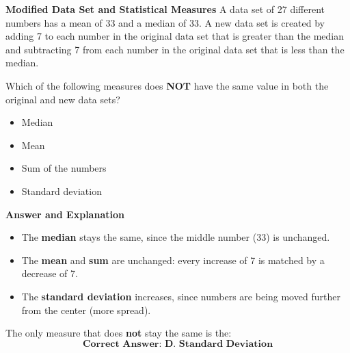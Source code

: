 \documentclass{beamer}
\begin{document}
\begin{frame}{\textbf{Modified Data Set and Statistical Measures}}
A data set of 27 different numbers has a mean of 33 and a median of 33. A new data set is created by adding 7 to each number in the original data set that is greater than the median and subtracting 7 from each number in the original data set that is less than the median.

Which of the following measures does \textbf{NOT} have the same value in both the original and new data sets?

\begin{itemize}
    \item[A.] Median
    \item[B.] Mean
    \item[C.] Sum of the numbers
    \item[D.] Standard deviation
\end{itemize}
\end{frame}

\begin{frame}{\textbf{Answer and Explanation}}
\begin{itemize}
    \item The \textbf{median} stays the same, since the middle number (33) is unchanged.
    \item The \textbf{mean} and \textbf{sum} are unchanged: every increase of 7 is matched by a decrease of 7.
    \item The \textbf{standard deviation} increases, since numbers are being moved further from the center (more spread).
\end{itemize}

The only measure that does \textbf{not} stay the same is the:
\[
\textbf{Correct Answer: D. Standard Deviation}
\]
\end{frame}
\end{document}

